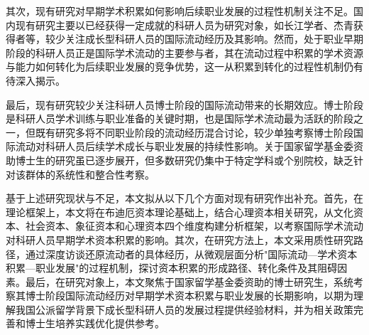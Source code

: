 其次，现有研究对早期学术积累如何影响后续职业发展的过程性机制关注不足。国内现有研究主要以已经获得一定成就的科研人员为研究对象，如长江学者、杰青获得者等，较少关注成长型科研人员的国际流动经历及其影响。然而，处于职业早期阶段的科研人员正是国际学术流动的主要参与者，其在流动过程中积累的学术资源与能力如何转化为后续职业发展的竞争优势，这一从积累到转化的过程性机制仍有待深入揭示。

最后，现有研究较少关注科研人员博士阶段的国际流动带来的长期效应。博士阶段是科研人员学术训练与职业准备的关键时期，也是国际学术流动最为活跃的阶段之一，但既有研究多将不同职业阶段的流动经历混合讨论，较少单独考察博士阶段国际流动对科研人员后续学术成长与职业发展的持续性影响。关于国家留学基金委资助博士生的研究虽已逐步展开，但多数研究仍集中于特定学科或个别院校，缺乏针对该群体的系统性和整合性考察。

基于上述研究现状与不足，本文拟从以下几个方面对现有研究作出补充。首先，在理论框架上，本文将在布迪厄资本理论基础上，结合心理资本相关研究，从文化资本、社会资本、象征资本和心理资本四个维度构建分析框架，以考察国际学术流动对科研人员早期学术资本积累的影响。其次，在研究方法上，本文采用质性研究路径，通过深度访谈还原流动者的具体经历，从微观层面分析"国际流动---学术资本积累---职业发展"的过程机制，探讨资本积累的形成路径、转化条件及其阻碍因素。最后，在研究对象上，本文聚焦于国家留学基金委资助的博士研究生，系统考察其博士阶段国际流动经历对早期学术资本积累与职业发展的长期影响，以期为理解我国公派留学背景下成长型科研人员的发展过程提供经验材料，并为相关政策完善和博士生培养实践优化提供参考。
